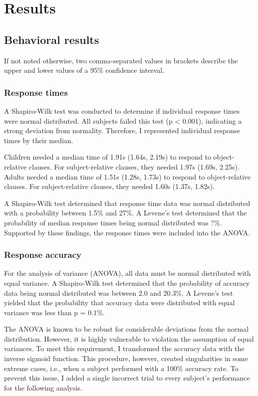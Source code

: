 
\chapter{Results}\label{results}

\section{Behavioral results}

If not noted otherwise, two comma-separated values in brackets describe the upper and lower values of a 95\% confidence interval.

\subsection{Response times}

A Shapiro-Wilk test was conducted to determine if individual response times were normal distributed.
All subjects failed this test (p < 0.001), indicating a strong deviation from normality.
Therefore, I represented individual response times by their median.

Children needed a median time of 1.91s (1.64s, 2.19s) to respond to object-relative clauses.
For subject-relative clauses, they needed 1.97s (1.69s, 2.25s).
Adults needed a median time of 1.51s (1.28s, 1.73s) to respond to object-relative clauses.
For subject-relative clauses, they needed 1.60s (1.37s, 1.82s).

A Shapiro-Wilk test determined that response time data was normal distributed with a probability between 1.5\% and 27\%.
A Levene's test determined that the probability of median response times being normal distributed was ?\%.
Supported by these findings, the response times were included into the ANOVA.

\subsection{Response accuracy}

For the analysis of variance (ANOVA), all data must be normal distributed with equal variance.
A Shapiro-Wilk test determined that the probability of accuracy data being normal distributed was between 2.0 and 20.3\%.
A Levene's test yielded that the probability that accuracy data were distributed with equal variance was less than p = 0.1\%.

The ANOVA is known to be robust for considerable deviations from the normal distribution.
However, it is highly vulnerable to violation the assumption of equal variances.
To meet this requirement, I transformed the accuracy data with the inverse sigmoid function.
This procedure, however, created singularities in some extreme cases, i.e., when a subject performed with a 100\% accuracy rate.
To prevent this issue, I added a single incorrect trial to every subject's performance for the following analysis.

